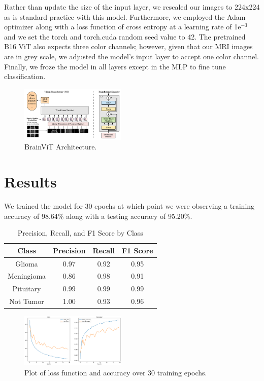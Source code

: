 \documentclass[conference]{IEEEtran}
\begin{document}
Rather than update the size of the input layer, we rescaled our images to 224x224 as is standard practice with this model. Furthermore, we employed the Adam optimizer along with a loss function of cross entropy at a learning rate of 1e$^{-3}$ and we set the torch and torch.cuda random seed value to 42. The pretrained B16 ViT also expects three color channels; however, given that our MRI images are in grey scale, we adjusted the model's input layer to accept one color channel. Finally, we froze the model in all layers except in the MLP to fine tune classification.

\begin{figure}[h]
    \centering
    \includegraphics[width=0.45\textwidth]{arch.png}
    \caption{BrainViT Architecture.}
    \label{fig:graphs}
\end{figure}

\section{Results}
We trained the model for 30 epochs at which point we were observing a training accuracy of 98.64\% along with a testing accuracy of 95.20\%.

\begin{table}[h]
    \centering
    \caption{Precision, Recall, and F1 Score by Class}
    \label{tab:example_with_headers}
    \begin{tabular}{|c|c|c|c|}
        \hline
        \textbf{Class} & \textbf{Precision} & \textbf{Recall} & \textbf{F1 Score} \\ 
        \hline
        Glioma & 0.97 & 0.92 & 0.95 \\ 
        Meningioma & 0.86 & 0.98 & 0.91 \\ 
        Pituitary & 0.99 & 0.99 & 0.99 \\
        Not Tumor & 1.00 & 0.93 & 0.96 \\
        \hline
    \end{tabular}
\end{table}

\begin{figure}[h]
    \centering
    \includegraphics[width=0.45\textwidth]{graph.png}
    \caption{Plot of loss function and accuracy over 30 training epochs.}
    \label{fig:graphs}
\end{figure}
\end{document}
